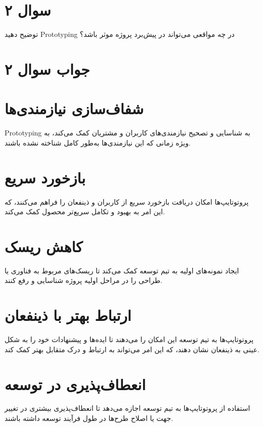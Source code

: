 \section*{سوال ۲}

توضیح دهید Prototyping در چه مواقعی می‌تواند در پیش‌برد پروژه موثر باشد؟

\section*{جواب سوال ۲}

\section*{شفاف‌سازی نیازمندی‌ها}
Prototyping
به شناسایی و تصحیح نیازمندی‌های کاربران و مشتریان کمک می‌کند، به ویژه زمانی که این نیازمندی‌ها به‌طور کامل شناخته نشده باشند.

\section*{بازخورد سریع}
پروتوتایپ‌ها امکان دریافت بازخورد سریع از کاربران و ذینفعان را فراهم می‌کنند، که این امر به بهبود و تکامل سریع‌تر محصول کمک می‌کند.

\section*{کاهش ریسک}
ایجاد نمونه‌های اولیه به تیم توسعه کمک می‌کند تا ریسک‌های مربوط به فناوری یا طراحی را در مراحل اولیه پروژه شناسایی و رفع کنند.

\section*{ارتباط بهتر با ذینفعان}
پروتوتایپ‌ها به تیم توسعه این امکان را می‌دهند تا ایده‌ها و پیشنهادات خود را به شکل عینی به ذینفعان نشان دهند، که این امر می‌تواند به ارتباط و درک متقابل بهتر کمک کند.

\section*{انعطاف‌پذیری در توسعه}
استفاده از پروتوتایپ‌ها به تیم توسعه اجازه می‌دهد تا انعطاف‌پذیری بیشتری در تغییر جهت یا اصلاح طرح‌ها در طول فرآیند توسعه داشته باشند.
